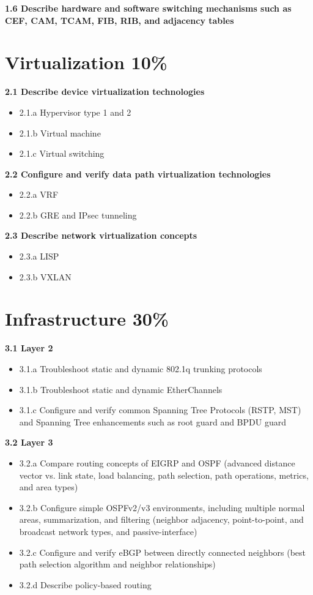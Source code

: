 \documentclass{article}
\begin{document}
\noindent\textbf{1.6 Describe hardware and software switching mechanisms such as CEF, CAM, TCAM, FIB, RIB, and adjacency tables}\\

\newpage
\section{Virtualization 10\%}
\textbf{2.1 Describe device virtualization technologies}
\begin{itemize}
\item 2.1.a Hypervisor type 1 and 2
\item 2.1.b Virtual machine
\item 2.1.c Virtual switching
\end{itemize}

\noindent\textbf{2.2 Configure and verify data path virtualization technologies}
\begin{itemize}
\item 2.2.a VRF
\item 2.2.b GRE and IPsec tunneling
\end{itemize}

\noindent\textbf{2.3 Describe network virtualization concepts}
\begin{itemize}
\item 2.3.a LISP
\item 2.3.b VXLAN
\end{itemize}

\newpage
\section{Infrastructure 30\%}
\textbf{3.1 Layer 2}
\begin{itemize}
\item 3.1.a Troubleshoot static and dynamic 802.1q trunking protocols
\item 3.1.b Troubleshoot static and dynamic EtherChannels
\item 3.1.c Configure and verify common Spanning Tree Protocols (RSTP, MST) and Spanning Tree enhancements such as root guard and BPDU guard
\end{itemize}

\noindent\textbf{3.2 Layer 3}
\begin{itemize}
\item 3.2.a Compare routing concepts of EIGRP and OSPF (advanced distance vector vs. link state, load balancing, path selection, path operations, metrics, and area types)
\item 3.2.b Configure simple OSPFv2/v3 environments, including multiple normal areas, summarization, and filtering (neighbor adjacency, point-to-point, and broadcast network types, and passive-interface)
\item 3.2.c Configure and verify eBGP between directly connected neighbors (best path selection algorithm and neighbor relationships)
\item 3.2.d Describe policy-based routing
\end{itemize}
\end{document}
